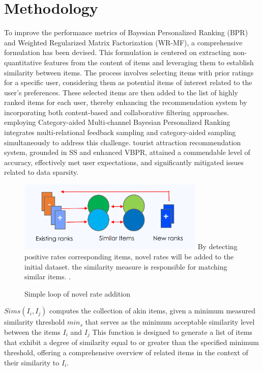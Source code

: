 \documentclass[journal]{IEEEtran}
\begin{document}
\section{Methodology}

To improve the performance metrics of Bayesian Personalized Ranking (BPR) and Weighted Regularized Matrix Factorization 
(WR-MF), a comprehensive formulation has been devised. This formulation is centered on extracting non-quantitative 
features from the content of items and leveraging them to establish similarity between items. The process involves 
selecting items with prior ratings for a specific user, considering them as potential items of interest related to 
the user's preferences. These selected items are then added to the list of highly ranked items for each user, thereby 
enhancing the recommendation system by incorporating both content-based and collaborative filtering approaches.
employing Category-aided Multi-channel Bayesian Personalized Ranking \cite{8689028} integrates multi-relational feedback sampling 
and category-aided sampling simultaneously to address this challenge. tourist attraction recommendation system, grounded in SS and 
enhanced VBPR, attained a commendable level of accuracy, effectively met user expectations, and significantly mitigated issues 
related to data sparsity.

\begin{figure}[!t]
  \centering
  \includegraphics[width=3.5in]{picture/Novel-Ranks.png}
  By detecting positive rates corresponding items, novel rates will be added to the initial dataset. the similarity measure is
  responsible for matching similar items.
  \DeclareGraphicsExtensions.
  \caption{Simple loop of novel rate addition}
  \label{fig:novel_rate}
\end{figure}

\(Sims(I_i,I_j)\) computes the collection of akin items, given a minimum measured similarity threshold \(min_s\) that serves as the 
minimum acceptable similarity level between the items \(I_i\) and \(I_j\) This function is designed to generate a list of items 
that exhibit a degree of similarity equal to or greater than the specified minimum threshold, offering a comprehensive overview 
of related items in the context of their similarity to \(I_i\).
\end{document}
